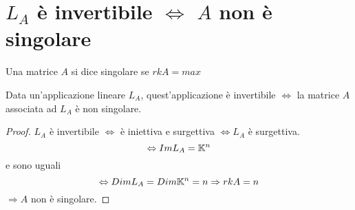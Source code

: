 \documentclass[]{article}
\begin{document}
\section{$L_A$ è invertibile $\Leftrightarrow$ $A$ non è singolare}
\begin{definizione}
Una matrice $A$ si dice singolare se $rk A = max $
\end{definizione}
\begin{lem}
Data un'applicazione lineare $L_A$, quest'applicazione è invertibile $\Leftrightarrow$ la matrice $A$ associata ad $L_A$ è non singolare.
\end{lem}
\begin{proof}
$L_A$ è invertibile $\Leftrightarrow$ è iniettiva e surgettiva $\Leftrightarrow L_A$ è surgettiva.
$$\Leftrightarrow ImL_A = \mathbb{K}^n$$ e sono uguali $$\Leftrightarrow DimL_A = Dim\mathbb{K}^n = n \Rightarrow rkA=n $$$\Rightarrow A$ non è singolare.
\end{proof}
\end{document}
